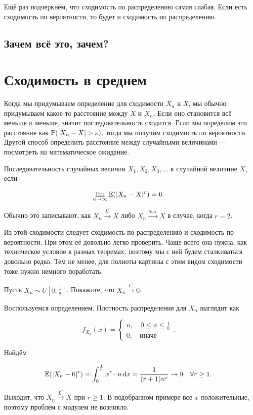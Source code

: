 \documentclass[12pt, a4paper, oneside]{article}
\begin{document}
Ещё раз подчеркнём, что сходимость по распределению самая слабая. Если есть сходимость по вероятности, то будет и сходимость по распределению. 

\subsection{Зачем всё это, зачем?}



\section{Сходимость в среднем} 

Когда мы придумываем определение для сходимости $X_n$ к $X$, мы обычно придумываем какое-то расстояние между $X$ и $X_n$. Если оно становится всё меньше и меньше, значит последовательность сходится. Если мы определим это расстояние как $\mathbb{P}(|X_n - X| > \varepsilon),$ тогда мы получим сходимость по вероятности. Другой способ определить расстояние между случайными величинами --- посмотреть на математическое ожидание. 

\begin{definition} 
Последовательность случайных величин $X_1, X_2, X_3, \ldots$  к случайной величине $X$, если 

\[
\lim_{n \to \infty} \mathbb{E}(|X_n - X|^r) = 0.
\]

Обычно это записывают, как $X_n \overset{L^r}{\to} X$ либо $X_n \overset{m.s.}{\to} X$ в случае, когда $r=2$.
\end{definition}

Из этой сходимости следует сходимость по распределению и сходимость по вероятности. При этом её довольно легко проверить. Чаще всего она нужна, как техническое условие в разных теоремах, поэтому мы с ней будем сталкиваться довольно редко. Тем не менее, для полноты картины с этим видом сходимости тоже нужно немного поработать.

\begin{problem}{ } 
Пусть $X_n \sim U \left[ 0;\frac{1}{n} \right]$. Покажите, что $X_n \overset{L^r}{\to} 0$.
\end{problem} 

\begin{sol}
Воспользуемся определением. Плотность распределения для $X_n$ выглядит как 

\[
f_{X_n}(x) = \begin{cases}  n, \quad 0 \le x \le \frac{1}{n} \\ 0, \quad \text{иначе} \end{cases}.
\]

Найдём 

\[
\mathbb{E}(|X_n - 0|^r) = \int_0^{\frac{1}{n}} x^r \cdot n \,\mathrm{d}x = \frac{1}{(r + 1) n^r} \to 0 \quad \forall r \ge 1.
\]

Выходит, что $X_n \overset{L^r}{\to} X$ при $r \ge 1$. В подобранном примере все $x$ положительные, поэтому проблем с модулем не возникло. 
\end{sol}
\end{document}

